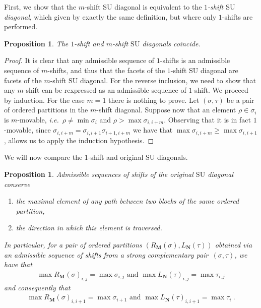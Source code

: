 \documentclass{amsart}
\newtheorem{proposition}[theorem]{Proposition}
\theoremstyle{definition}
\newcommand{\ie}{\textit{i.e.}~} %
\newcommand{\SU}{\mathrm{SU}}
\begin{document}
First, we show that the $m$-shift $\SU$ diagonal is equivalent to the \emph{$1$-shift $\SU$ diagonal}, which given by exactly the same definition, but where only $1$-shifts are performed. 

\begin{proposition}
    \label{prop:iso-1-to-m-shift}
    The $1$-shift and $m$-shift $\SU$ diagonals coincide.
\end{proposition}

\begin{proof}
    It is clear that any admissible sequence of $1$-shifts is an admissible sequence of $m$-shifts, and thus that the facets of the $1$-shift $\SU$ diagonal are facets of the $m$-shift $\SU$ diagonal. 
    For the reverse inclusion, we need to show that any $m$-shift can be rexpressed as an admissible sequence of $1$-shift. 
    We proceed by induction.
    For the case $m=1$ there is nothing to prove.
    Let $(\sigma,\tau)$ be a pair of ordered partitions in the $m$-shift diagonal. 
    Suppose now that an element $\rho \in \sigma_i$ is $m$-movable, \ie $\rho \neq \min \sigma_i$ and $\rho > \max \sigma_{i,i+m}$.
    Observing that it is in fact $1$-movable, since $\sigma_{i,i+m}=\sigma_{i,i+1}\sigma_{i+1,i+m}$ we have that $\max \sigma_{i,i+m}\geq \max \sigma_{i,i+1}$, allows us to apply the induction hypothesis.
\end{proof}

We will now compare the $1$-shift and original $\SU$ diagonals. 

\begin{proposition} 
\label{prop:SU-preserves-max}
Admissible sequences of shifts of the original $\SU$ diagonal conserve 
\begin{enumerate}
    \item the maximal element of any path between two blocks of the same ordered partition,
    \item the direction in which this element is traversed. 
\end{enumerate}

In particular, for a pair of ordered partitions $(R_{\mathbf{M}}(\sigma),L_{\mathbf{N}}(\tau))$ obtained via an admissible sequence of shifts from a strong complementary pair~$(\sigma,\tau)$, we have that
\begin{align}
    \label{eq:max-1}
    \max R_{\mathbf{M}}(\sigma)_{i,j} = \max \sigma_{i,j} \text{ and } \max L_{\mathbf{N}}(\tau)_{i,j} = \max \tau_{i,j}
\end{align}
and consequently that
\begin{align}
    \label{eq:max-2}
    \max R_{\mathbf{M}}(\sigma)_{i,i+1} = \max \sigma_{i+1} \text{ and } \max L_{\mathbf{N}}(\tau)_{i,i+1} = \max \tau_{i}  \ .
\end{align}
\end{proposition}
\end{document}

